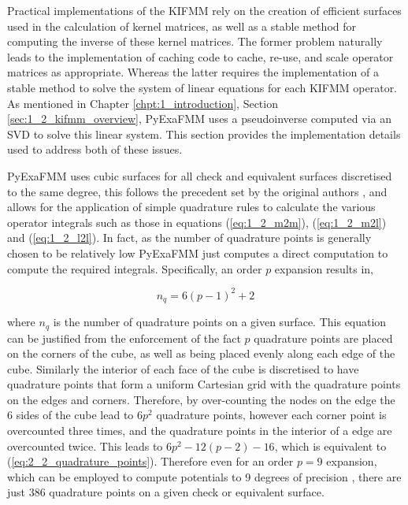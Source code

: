 Practical implementations of the \gls{KIFMM} rely on the creation of efficient
surfaces used in the calculation of kernel matrices, as well as a stable method for
computing the inverse of these kernel matrices. The former problem naturally leads
to the implementation of caching code to cache, re-use, and scale operator matrices
as appropriate. Whereas the latter requires the implementation of a stable method to
solve the system of linear equations for each \gls{KIFMM} operator. As mentioned
in Chapter \ref{chpt:1_introduction}, Section \ref{sec:1_2_kifmm_overview}, \gls{PyExaFMM} uses
a pseudoinverse computed via an SVD to solve this linear system. This section
provides the implementation details used to address both of these issues.

\gls{PyExaFMM} uses cubic surfaces for all check and equivalent surfaces discretised
to the same degree, this follows the precedent set by the original authors \cite{Ying:2004:JCP}, and
allows for the application of simple quadrature rules to calculate the various
operator integrals such as those in equations (\ref{eq:1_2_m2m}), (\ref{eq:1_2_m2l})
and (\ref{eq:1_2_l2l}). In fact, as the number of quadrature points is generally
chosen to be relatively low \gls{PyExaFMM} just computes a direct computation to
compute the required integrals. Specifically, an order $p$ expansion results in,

\begin{equation}
    n_q =  6(p-1)^2 + 2
    \label{eq:2_2_quadrature_points}
\end{equation}

where $n_q$ is the number of quadrature points on a given surface. This equation can be
justified from the enforcement of the fact $p$ quadrature points are placed on the corners
of the cube, as well as being placed evenly along each edge of the cube. Similarly the
interior of each face of the cube is discretised to have quadrature points that form
a uniform Cartesian grid with the quadrature points on the edges and corners. Therefore,
by over-counting the nodes on the edge the 6 sides of the cube lead to $6p^2$ quadrature
points, however each corner point is overcounted three times, and the quadrature points
in the interior of a edge are overcounted twice. This leads to $6p^2 - 12(p-2) - 16$,
which is equivalent to (\ref{eq:2_2_quadrature_points}). Therefore even for an order $p=9$
expansion, which can be employed to compute potentials to 9 degrees of precision
\cite{Malhotra:2015:CCP}, there are just 386 quadrature points on a given check
or equivalent surface.

